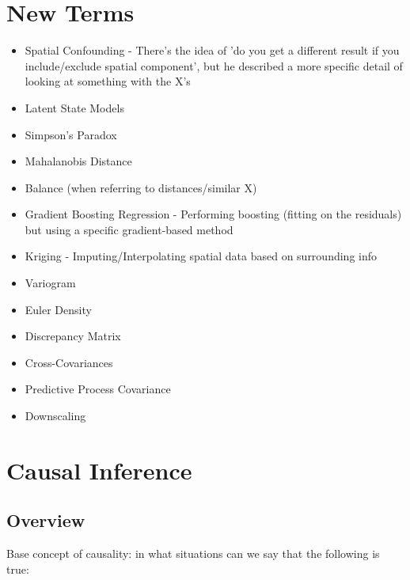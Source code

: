 \documentclass{article}
\begin{document}
\tableofcontents

\newpage


\section{New Terms}

\begin{itemize}
    \item Spatial Confounding - There's the idea of 'do you get a different result if you include/exclude spatial component', but he described a more specific detail of looking at something with the X's
    \item Latent State Models
    \item Simpson's Paradox
    \item Mahalanobis Distance
    \item Balance (when referring to distances/similar X)
    \item Gradient Boosting Regression - Performing boosting (fitting on the residuals) but using a specific gradient-based method
    \item Kriging - Imputing/Interpolating spatial data based on surrounding info
    \item Variogram
    \item Euler Density
    \item Discrepancy Matrix
    \item Cross-Covariances
    \item Predictive Process Covariance
    \item Downscaling
\end{itemize}



\section{Causal Inference}

\subsection{Overview}

Base concept of causality: in what situations can we say that the following is true:
\end{document}
